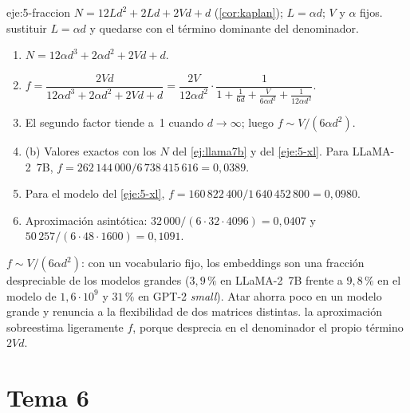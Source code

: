 \begin{solucion}{eje:5-fraccion}
\datos $N=12Ld^{2}+2Ld+2Vd+d$ (\cref{cor:kaplan}); $L=\alpha d$; $V$ y $\alpha$ fijos.
\planteamiento sustituir $L=\alpha d$ y quedarse con el término dominante del denominador.
\pasos
\begin{enumerate}[label=\arabic*.]
  \item $N=12\alpha d^{3}+2\alpha d^{2}+2Vd+d$.
  \item $f=\dfrac{2Vd}{12\alpha d^{3}+2\alpha d^{2}+2Vd+d}=\dfrac{2V}{12\alpha d^{2}}\cdot\dfrac{1}{1+\frac{1}{6d}+\frac{V}{6\alpha d^{2}}+\frac{1}{12\alpha d^{2}}}$.
  \item El segundo factor tiende a~1 cuando $d\to\infty$; luego $f\sim V/(6\alpha d^{2})$.
  \item (b) Valores exactos con los $N$ del \cref{ej:llama7b} y del \cref{eje:5-xl}. Para LLaMA-2~7B, $f=262\,144\,000/6\,738\,415\,616=0{,}0389$.
  \item Para el modelo del \cref{eje:5-xl}, $f=160\,822\,400/1\,640\,452\,800=0{,}0980$.
  \item Aproximación asintótica: $32\,000/(6\cdot 32\cdot 4096)=0{,}0407$ y $50\,257/(6\cdot 48\cdot 1600)=0{,}1091$.
\end{enumerate}
\resultado \textbf{$f\sim V/(6\alpha d^{2})$}: con un vocabulario fijo, los embeddings son una fracción despreciable de los modelos grandes ($3{,}9\,\%$ en LLaMA-2~7B frente a $9{,}8\,\%$ en el modelo de $1{,}6\cdot 10^{9}$ y $31\,\%$ en GPT-2 \emph{small}). Atar ahorra poco en un modelo grande y renuncia a la flexibilidad de dos matrices distintas.
\comprobacion la aproximación sobreestima ligeramente $f$, porque desprecia en el denominador el propio término $2Vd$.
\end{solucion}

\section{Tema 6}

